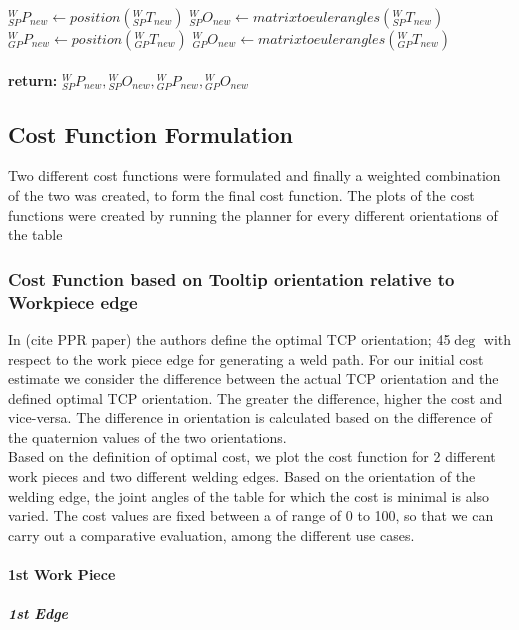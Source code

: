 \begin{algorithm}
\begin{algorithmic}[1]
		\State $\textit{$_{SP}^{W}P_{new}$} \gets position(\textit{$_{SP}^{W}T_{new}$})$
		\State $\textit{$_{SP}^{W}O_{new}$} \gets matrixtoeulerangles(\textit{$_{SP}^{W}T_{new}$})$
		\State $\textit{$_{GP}^{W}P_{new}$} \gets position(\textit{$_{GP}^{W}T_{new}$})$
		\State $\textit{$_{GP}^{W}O_{new}$} \gets matrixtoeulerangles(\textit{$_{GP}^{W}T_{new}$})$\\
		
		\EndFor \\
		\textbf{return:} $\textit{$_{SP}^{W}P_{new}$},\textit{$_{SP}^{W}O_{new}$},\textit{$_{GP}^{W}P_{new}$},\textit{$_{GP}^{W}O_{new}$}$
	\end{algorithmic}
\end{algorithm}
\newpage
\subsection{Cost Function Formulation}
Two different cost functions were formulated and finally a weighted combination of the two was created, to form the final cost function. The plots of the cost functions were created by running the planner for every different orientations of the table
\subsubsection{Cost Function based on Tooltip orientation relative to Workpiece edge}
In (cite PPR paper) the authors define the optimal TCP orientation; 45$\deg$ with respect to the work piece edge for generating a weld path. For our initial cost estimate we consider the difference between the actual TCP orientation and the defined optimal TCP orientation. The greater the difference, higher the cost and vice-versa. The difference in orientation is calculated based on the difference of the quaternion values of the two orientations.\\
Based on the definition of optimal cost, we plot the cost function for 2 different work pieces and two different welding edges. Based on the orientation of the welding edge, the joint angles of the table for which the cost is minimal is also varied. The cost values are fixed between a of range of 0 to 100, so that we can carry out a comparative evaluation, among the different use cases.
\paragraph{1st Work Piece}
\subparagraph{1st Edge}

